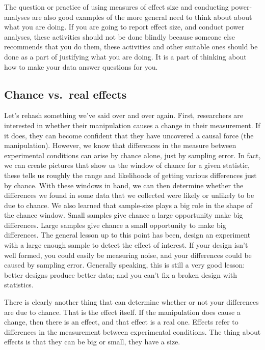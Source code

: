 \documentclass[]{book}
\begin{document}
The question or practice of using measures of effect size and conducting power-analyses are also good examples of the more general need to think about about what you are doing. If you are going to report effect size, and conduct power analyses, these activities should not be done blindly because someone else recommends that you do them, these activities and other suitable ones should be done as a part of justifying what you are doing. It is a part of thinking about how to make your data answer questions for you.

\hypertarget{chance-vs.real-effects}{%
\subsection{Chance vs.~real effects}\label{chance-vs.real-effects}}

Let's rehash something we've said over and over again. First, researchers are interested in whether their manipulation causes a change in their measurement. If it does, they can become confident that they have uncovered a causal force (the manipulation). However, we know that differences in the measure between experimental conditions can arise by chance alone, just by sampling error. In fact, we can create pictures that show us the window of chance for a given statistic, these tells us roughly the range and likelihoods of getting various differences just by chance. With these windows in hand, we can then determine whether the differences we found in some data that we collected were likely or unlikely to be due to chance. We also learned that sample-size plays a big role in the shape of the chance window. Small samples give chance a large opportunity make big differences. Large samples give chance a small opportunity to make big differences. The general lesson up to this point has been, design an experiment with a large enough sample to detect the effect of interest. If your design isn't well formed, you could easily be measuring noise, and your differences could be caused by sampling error. Generally speaking, this is still a very good lesson: better designs produce better data; and you can't fix a broken design with statistics.

There is clearly another thing that can determine whether or not your differences are due to chance. That is the effect itself. If the manipulation does cause a change, then there is an effect, and that effect is a real one. Effects refer to differences in the measurement between experimental conditions. The thing about effects is that they can be big or small, they have a size.
\end{document}
